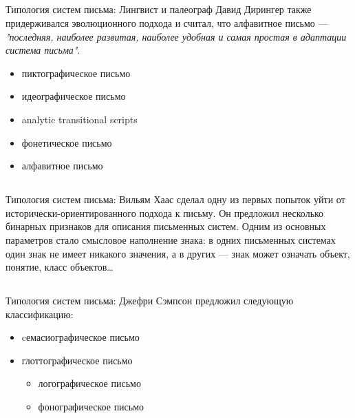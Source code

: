 \subsection{\citep{diringer62}}
\begin{frame}{Типология систем письма: \citep{diringer62}}
Лингвист и палеограф Давид Дирингер также придерживался эволюционного подхода и  считал, что алфавитное письмо — \textit{"последняя, наиболее развитая, наиболее удобная и самая простая в адаптации система письма"}.
\begin{itemize}
\item пиктографическое письмо
\item идеографическое письмо
\item analytic transitional scripts
\item фонетическое письмо
\item алфавитное письмо
\end{itemize}
\end{frame}
\subsection{\citep{haas76}}
\begin{frame}{Типология систем письма: \citep{haas76}}
Вильям Хаас сделал одну из первых попыток уйти от исторически-ориентированного подхода к письму. Он предложил несколько бинарных признаков для описания письменных систем. Одним из основных параметров стало смысловое наполнение знака: в одних письменных системах один знак не имеет никакого значения, а в других — знак может означать объект, понятие, класс объектов… 
\end{frame}
\subsection{\citep{sampson85}}
\begin{frame}{Типология систем письма: \citep{sampson85}}
Джефри Сэмпсон предложил следующую классификацию:
\begin{itemize}
\item cемасиографическое письмо
\item глоттографическое письмо
\begin{itemize}
\item логографическое письмо
\item фонографическое письмо
\end{itemize}
\end{itemize}
\end{frame}
